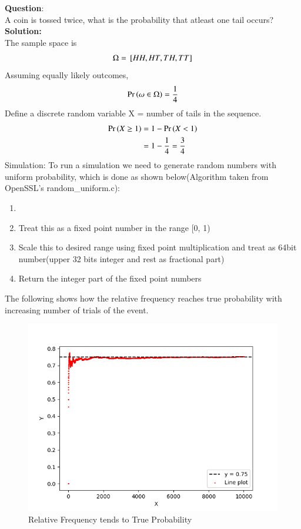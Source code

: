 \documentclass[journal]{IEEEtran}
\begin{document}
\textbf{Question}:\\
A coin is tossed twice, what is the probability that atleast one tail occurs?
\\
\textbf{Solution: }\\
The sample space is 
\begin{align}
  \Omega = {}\left[HH, HT, TH, TT\right]
\end{align}
Assuming equally likely outcomes, 
\begin{align}
  \Pr\left(\omega \in \Omega\right) = \frac{1}{4}
\end{align}
Define a discrete random variable X = number of tails in the sequence.
\begin{align}
  \Pr\left(X \ge 1\right) &= 1 - \Pr\left(X < 1\right)\\
  &= 1 - \frac{1}{4} = \frac{3}{4}
\end{align}
Simulation:
\newline
To run a simulation we need to generate random numbers with uniform probability, which is done
as shown below(Algorithm taken from OpenSSL's random\_uniform.c):
\begin{enumerate}
  \item {}
  \item Treat this as a fixed point number in the range [0, 1)
  \item Scale this to desired range using fixed point multiplication and treat as 64bit number(upper 32 bits integer and rest as fractional part)
  \item Return the integer part of the fixed point numbers
\end{enumerate}
The following shows how the relative frequency reaches true probability with increasing number of trials of the event.
\begin{figure}[h!]
   \centering
   \includegraphics[width=0.7\columnwidth]{figs/fig.png}
    \caption{Relative Frequency tends to True Probability}
\end{figure}
\end{document}
